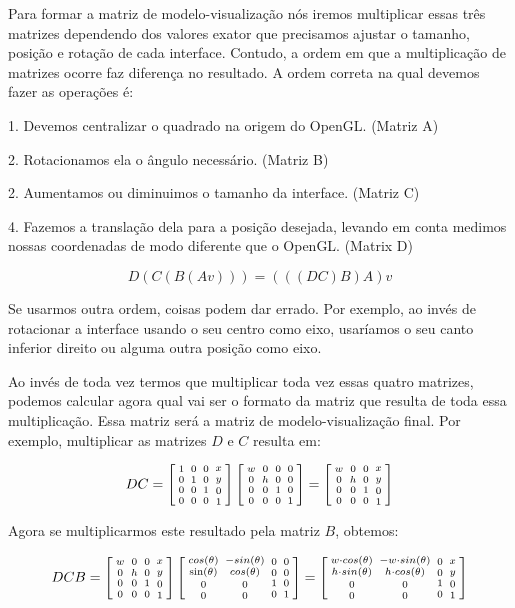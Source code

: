 Para formar a matriz de modelo-visualização nós iremos multiplicar
essas três matrizes dependendo dos valores exator que precisamos
ajustar o tamanho, posição e rotação de cada interface. Contudo, a
ordem em que a multiplicação de matrizes ocorre faz diferença no
resultado. A ordem correta na qual devemos fazer as operações é:

1. Devemos centralizar o quadrado na origem do OpenGL. (Matriz A)

2. Rotacionamos ela o ângulo necessário. (Matriz B)

2. Aumentamos ou diminuimos o tamanho da interface. (Matriz C)

4. Fazemos a translação dela para a posição desejada, levando em conta
 medimos nossas coordenadas de modo diferente que o OpenGL. (Matrix D)

$$
D(C(B(A v))) = (((DC)B)A)v
$$

Se usarmos outra ordem, coisas podem dar errado. Por exemplo, ao invés
de rotacionar a interface usando o seu centro como eixo, usaríamos o
seu canto inferior direito ou alguma outra posição como eixo.

Ao invés de toda vez termos que multiplicar toda vez essas quatro
matrizes, podemos calcular agora qual vai ser o formato da matriz que
resulta de toda essa multiplicação. Essa matriz será a matriz de
modelo-visualização final. Por exemplo, multiplicar as matrizes $D$ e
$C$ resulta em:

$$ DC=\left[{{1 \atop 0}\atop {0\atop 0}}{{0 \atop 1}\atop {0 \atop
      0}}{{0\atop 0}\atop{1 \atop 0}}{{x \atop y}\atop{0\atop
      1}}\right]\left[{{w
      \atop 0}\atop {0\atop 0}}{{0 \atop h}\atop {0 \atop 0}}{{0\atop
      0}\atop{1 \atop 0}}{{0 \atop 0}\atop{0\atop 1}}\right]=
\left[{{w \atop 0}\atop {0\atop 0}}
  {{0 \atop h}\atop {0 \atop 0}}
  {{0\atop 0}\atop{1 \atop 0}}
  {{x \atop y}\atop{0\atop 1}}\right]
$$

Agora se multiplicarmos este resultado pela matriz $B$, obtemos:

$$ DCB = \left[{{w \atop 0}\atop {0\atop 0}} {{0 \atop h}\atop
  {0 \atop 0}} {{0\atop 0}\atop{1 \atop 0}} {{x \atop y}\atop{0\atop
  1}}\right]\left[{{cos(\theta) \atop \sin(\theta)}\atop {0\atop
  0}}{{-sin(\theta) \atop cos(\theta)}\atop {0 \atop 0}}{{0\atop
  0}\atop{1 \atop 0}}{{0 \atop 0}\atop{0\atop 1}}\right]=
\left[{{w\cdot cos(\theta) \atop h\cdot sin(\theta)}\atop {0\atop 0}}
  {{-w\cdot sin(\theta) \atop h\cdot cos(\theta)}\atop {0 \atop 0}}
  {{0\atop 0}\atop{1 \atop 0}}
  {{x \atop y}\atop{0\atop 1}}\right]
$$

